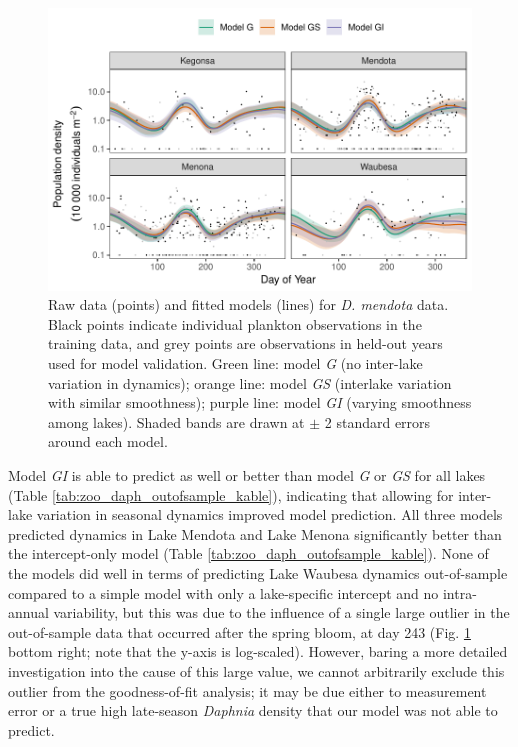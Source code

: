 \documentclass[12pt]{article}
\begin{document}
\begin{figure}
\centering
\includegraphics{../figures/zoo_daph_plot-1.pdf}
\caption{\label{fig:daph_smooth}Raw data (points) and fitted models
(lines) for \textit{D. mendota} data. Black points indicate individual
plankton observations in the training data, and grey points are
observations in held-out years used for model validation. Green line:
model \emph{G} (no inter-lake variation in dynamics); orange line: model
\emph{GS} (interlake variation with similar smoothness); purple line:
model \emph{GI} (varying smoothness among lakes). Shaded bands are drawn
at \(\pm\) 2 standard errors around each model.}
\end{figure}

Model \emph{GI} is able to predict as well or better than model \emph{G}
or \emph{GS} for all lakes (Table \ref{tab:zoo_daph_outofsample_kable}),
indicating that allowing for inter-lake variation in seasonal dynamics
improved model prediction. All three models predicted dynamics in Lake
Mendota and Lake Menona significantly better than the intercept-only
model (Table \ref{tab:zoo_daph_outofsample_kable}). None of the models
did well in terms of predicting Lake Waubesa dynamics out-of-sample
compared to a simple model with only a lake-specific intercept and no
intra-annual variability, but this was due to the influence of a single
large outlier in the out-of-sample data that occurred after the spring
bloom, at day 243 (Fig. \ref{fig:daph_smooth} bottom right; note that
the y-axis is log-scaled). However, baring a more detailed investigation
into the cause of this large value, we cannot arbitrarily exclude this
outlier from the goodness-of-fit analysis; it may be due either to
measurement error or a true high late-season \emph{Daphnia} density that
our model was not able to predict.
\end{document}
